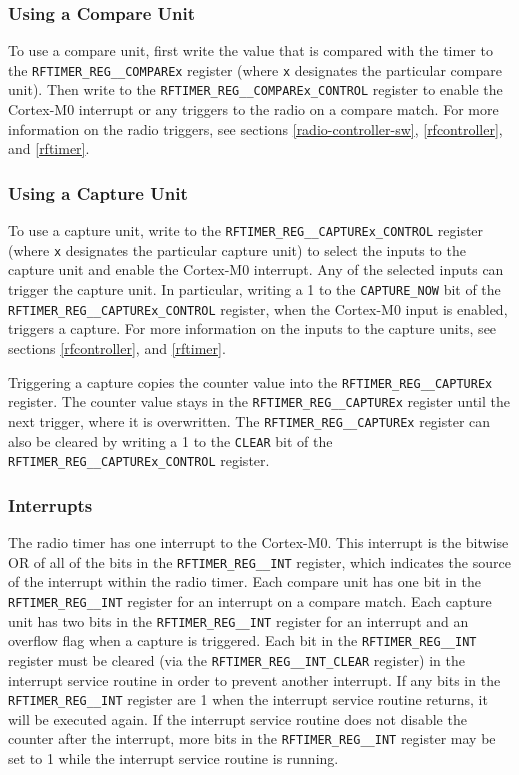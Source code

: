 \subsubsection{Using a Compare Unit}
To use a compare unit, first write the value that is compared with the timer to the \texttt{RFTIMER\_REG\_\_COMPAREx} register (where \texttt{x} designates the particular compare unit). Then write to the \texttt{RFTIMER\_REG\_\_COMPAREx\_CONTROL} register to enable the Cortex-M0 interrupt or any triggers to the radio on a compare match. For more information on the radio triggers, see sections \ref{radio-controller-sw}, \ref{rfcontroller}, and \ref{rftimer}.

\subsubsection{Using a Capture Unit}
To use a capture unit, write to the \texttt{RFTIMER\_REG\_\_CAPTUREx\_CONTROL} register (where \texttt{x} designates the particular capture unit) to select the inputs to the capture unit and enable the Cortex-M0 interrupt. Any of the selected inputs can trigger the capture unit. In particular, writing a 1 to the \texttt{CAPTURE\_NOW} bit of the \texttt{RFTIMER\_REG\_\_CAPTU\-R\-E\-x\-\_\-CONTROL} register, when the Cortex-M0 input is enabled, triggers a capture. For more information on the inputs to the capture units, see sections \ref{rfcontroller}, and \ref{rftimer}.

Triggering a capture copies the counter value into the \texttt{RFTIMER\_REG\_\_CAPTUREx} register. The counter value stays in the \texttt{RFTIMER\_REG\_\_CAPTUREx} register until the next trigger, where it is overwritten. The \texttt{RFTIMER\_REG\_\_CAPTUREx} register can also be cleared by writing a 1 to the \texttt{CLEAR} bit of the \texttt{RFTIMER\_REG\_\_CAPTUREx\_CONTROL} register.

\subsubsection{Interrupts}
The radio timer has one interrupt to the Cortex-M0. This interrupt is the bitwise OR of all of the bits in the \texttt{RFTIMER\_REG\_\_INT} register, which indicates the source of the interrupt within the radio timer. Each compare unit has one bit in the \texttt{RFTIMER\_REG\_\_INT} register for an interrupt on a compare match. Each capture unit has two bits in the \texttt{RFTIMER\_REG\_\_INT} register for an interrupt and an overflow flag when a capture is triggered. Each bit in the \texttt{RFTIMER\_REG\_\_INT} register must be cleared (via the \texttt{RFTIMER\_REG\_\_INT\_CLEAR} register) in the interrupt service routine in order to prevent another interrupt. If any bits in the \texttt{RFTIMER\_REG\_\_INT} register are 1 when the interrupt service routine returns, it will be executed again. If the interrupt service routine does not disable the counter after the interrupt, more bits in the \texttt{RFTIMER\_REG\_\_INT} register may be set to 1 while the interrupt service routine is running.

